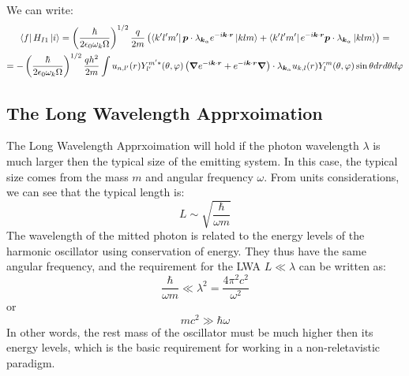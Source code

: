 \documentclass{article}
\begin{document}
We can write:
\begin{equation}
\begin{gathered}
\label{eq:pre-lwa}
    \bra{f} H_{I1} \ket{i} = \left(\frac{\hbar}{2\epsilon_0\omega_k\Omega}\right)^{1/2}
    \frac{q}{2m}
    \left(
        \bra{k'l'm'}\boldsymbol{p}\cdot{\lambda}_{\boldsymbol{k}_{\alpha}}e^{-i\boldsymbol{k}\cdot\boldsymbol{r}}\ket{klm}
        +
        \bra{k'l'm'}e^{-i\boldsymbol{k}\cdot\boldsymbol{r}}\boldsymbol{p}\cdot{\lambda}_{\boldsymbol{k}_{\alpha}}\ket{klm}
    \right)
    = \\ = -\left(\frac{\hbar}{2\epsilon_0\omega_k\Omega}\right)^{1/2}
    \frac{qh^2}{2m}
    \int
    u_{n, l'}(r) Y^{m'*}_{l'}(\theta, \varphi)
    \left(
        \boldsymbol{\nabla}e^{-i\boldsymbol{k}\cdot\boldsymbol{r}}
    +
    e^{-i\boldsymbol{k}\cdot\boldsymbol{r}}\boldsymbol{\nabla}
    \right)\cdot{\lambda}_{\boldsymbol{k}_{\alpha}} u_{k, l}(r) Y^{m}_{l}(\theta, \varphi)
    \sin\theta dr d\theta d\varphi
\end{gathered}
\end{equation}

\subsection{The Long Wavelength Apprxoimation}
The Long Wavelength Apprxoimation will hold if the photon wavelength $\lambda$ is much larger then the typical size of the emitting system. In this case, the typical size comes from the mass $m$ and angular frequency $\omega$. From units considerations, we can see that the typical length is:
\begin{equation}
    L \sim \sqrt{\frac{\hbar}{\omega m}}
\end{equation}
The wavelength of the mitted photon is related to the energy levels of the harmonic oscillator using conservation of energy. They thus have the same angular frequency, and the requirement for the LWA $L \ll \lambda$ can be written as:
\begin{equation}
    \frac{\hbar}{\omega m} \ll \lambda^2 = \frac{4\pi^2 c^2}{\omega^2}
\end{equation}
or
\begin{equation}
    mc^2 \gg \hbar\omega
\end{equation}
In other words, the rest mass of the oscillator must be much higher then its energy levels, which is the basic requirement for working in a non-reletavistic paradigm.
\end{document}

